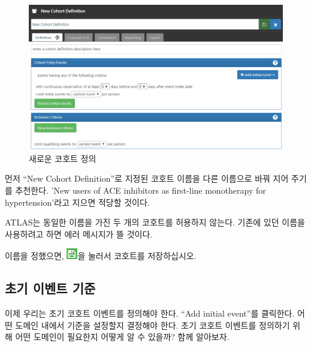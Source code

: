 \documentclass[10.5pt]{book}
\theoremstyle{definition}
\theoremstyle{definition}
\theoremstyle{definition}
\theoremstyle{remark}
\let\BeginKnitrBlock\begin \let\EndKnitrBlock\end
\begin{document}
\begin{figure}

{\centering \includegraphics[width=1\linewidth]{images/Cohorts/ATLAS-defineacohort} 

}

\caption{새로운 코호트 정의}\label{fig:ATLASdefineacohort}
\end{figure}

먼저 ``New Cohort Definition''로 지정된 코호트 이름을 다른 이름으로 바꿔
지어 주기를 추천한다. 'New users of ACE inhibitors as first-line
monotherapy for hypertension'라고 지으면 적당할 것이다.

\BeginKnitrBlock{rmdimportant}
ATLAS는 동일한 이름을 가진 두 개의 코호트를 허용하지 않는다. 기존에 있던
이름을 사용하려고 하면 에러 메시지가 뜰 것이다.
\EndKnitrBlock{rmdimportant}

이름을 정했으면, \includegraphics{images/Cohorts/save.png}을 눌러서
코호트를 저장하십시오.

\subsection{초기 이벤트 기준}\label{--}

이제 우리는 초기 코호트 이벤트를 정의해야 한다. ``Add initial event''를
클릭한다. 어떤 도메인 내에서 기준을 설정할지 결정해야 한다. 초기 코호트
이벤트를 정의하기 위해 어떤 도메인이 필요한지 어떻게 알 수 있을까? 함께
알아보자.
\end{document}
